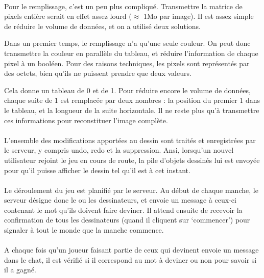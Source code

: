 \documentclass[11pt,a4paper]{article}
\begin{document}
                \paragraph{}
                Pour le remplissage, c'est un peu plus compliqué.
                Transmettre la matrice de pixels entière serait en effet assez lourd ($\approx$ 1Mo par image).
                Il est assez simple de réduire le volume de données, et on a utilisé deux solutions.
                
                Dans un premier temps, le remplissage n'a qu'une seule couleur.
                On peut donc transmettre la couleur en parallèle du tableau,
                et réduire l'information de chaque pixel à un booléen.
                Pour des raisons techniques, les pixels sont représentés par des octets,
                bien qu'ils ne puissent prendre que deux valeurs.

                Cela donne un tableau de 0 et de 1.
                Pour réduire encore le volume de données,
                chaque suite de 1 est remplacée par deux nombres :
                la position du premier 1 dans le tableau, et la longueur de la suite horizontale.
                Il ne reste plus qu'à transmettre ces informations pour reconstituer l'image complète.
                \paragraph{}
                L'ensemble des modifications apportées au dessin sont traités et enregistrées par le serveur,
                y compris undo, redo et la suppression.
                Ansi, lorsqu'un nouvel utilisateur rejoint le jeu en cours de route,
                la pile d'objets dessinés lui est envoyée pour qu'il puisse afficher le dessin tel qu'il est à cet instant.
                \paragraph{}
                Le déroulement du jeu est planifié par le serveur.
                Au début de chaque manche, le serveur désigne donc le ou les dessinateurs,
                et envoie un message à ceux-ci contenant le mot qu'ils doivent faire deviner.
                Il attend ensuite de recevoir la confirmation de tous les dessinateurs (quand il cliquent sur `commencer') pour signaler
                à tout le monde que la manche commence.
                \paragraph{}
                A chaque fois qu'un joueur faisant partie de ceux qui devinent envoie un message dans le chat,
                il est vérifié si il correspond au mot à deviner ou non pour savoir si il a gagné.
\end{document}
